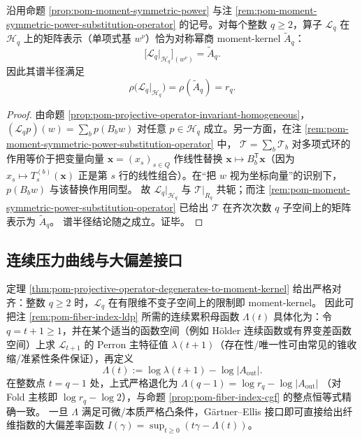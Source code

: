 \begin{theorem}[整数退化 = 对称幂 moment-kernel]\label{thm:pom-projective-operator-degenerates-to-moment-kernel}
沿用命题 \ref{prop:pom-moment-symmetric-power} 与注 \ref{rem:pom-moment-symmetric-power-substitution-operator} 的记号。对每个整数 \(q\ge 2\)，算子 \(\mathcal{L}_q\) 在 \(\mathcal{H}_q\) 上的矩阵表示（单项式基 \(w^\nu\)）恰为对称幂商 moment-kernel \(\widetilde A_q\)：
\[
\bigl[\mathcal{L}_q|_{\mathcal{H}_q}\bigr]_{(w^\nu)}=\widetilde A_q.
\]
因此其谱半径满足
\[
\rho\!\bigl(\mathcal{L}_q|_{\mathcal{H}_q}\bigr)=\rho(\widetilde A_q)=r_q.
\]
\end{theorem}
\begin{proof}
由命题 \ref{prop:pom-projective-operator-invariant-homogeneous}，
\(
(\mathcal{L}_q p)(w)=\sum_{b} p(B_b w)
\)
对任意 \(p\in\mathcal{H}_q\) 成立。另一方面，在注 \ref{rem:pom-moment-symmetric-power-substitution-operator} 中，
\(\mathcal{T}=\sum_b \mathcal{T}_b\)
对多项式环的作用等价于把变量向量 \(\mathbf{x}=(x_s)_{s\in Q}\) 作线性替换 \(\mathbf{x}\mapsto B_b^{\mathsf T}\mathbf{x}\)（因为 \(x_s\mapsto T_s^{(b)}(\mathbf{x})\) 正是第 \(s\) 行的线性组合）。在“把 \(w\) 视为坐标向量”的识别下，\(p(B_b w)\) 与该替换作用同型。
故 \(\mathcal{L}_q|_{\mathcal{H}_q}\) 与 \(\mathcal{T}|_{R_q}\) 共轭；而注 \ref{rem:pom-moment-symmetric-power-substitution-operator} 已给出 \(\mathcal{T}\) 在齐次次数 \(q\) 子空间上的矩阵表示为 \(\widetilde A_q\)。
谱半径结论随之成立。证毕。
\end{proof}

\subsection{连续压力曲线与大偏差接口}
\begin{remark}\label{rem:pom-projective-pressure-route}
定理 \ref{thm:pom-projective-operator-degenerates-to-moment-kernel} 给出严格对齐：整数 \(q\ge 2\) 时，\(\mathcal{L}_q\) 在有限维不变子空间上的限制即 moment-kernel。
因此可把注 \ref{rem:pom-fiber-index-ldp} 所需的连续累积母函数 \(\Lambda(t)\) 具体化为：令 \(q=t+1\ge 1\)，并在某个适当的函数空间（例如 Hölder 连续函数或有界变差函数空间）上求 \(\mathcal{L}_{t+1}\) 的 Perron 主特征值 \(\lambda(t+1)\)（存在性/唯一性可由常见的锥收缩/准紧性条件保证），再定义
\[
\Lambda(t):=\log\lambda(t+1)-\log|A_{\mathrm{out}}|.
\]
在整数点 \(t=q-1\) 处，上式严格退化为
\(
\Lambda(q-1)=\log r_q-\log|A_{\mathrm{out}}|
\)
（对 Fold 主核即 \(\log r_q-\log 2\)），与命题 \ref{prop:pom-fiber-index-cgf} 的整点恒等式精确一致。
一旦 \(\Lambda\) 满足可微/本质严格凸条件，G\"artner--Ellis 接口即可直接给出纤维指数的大偏差率函数 \(I(\gamma)=\sup_{t\ge 0}(t\gamma-\Lambda(t))\)。
\end{remark}

